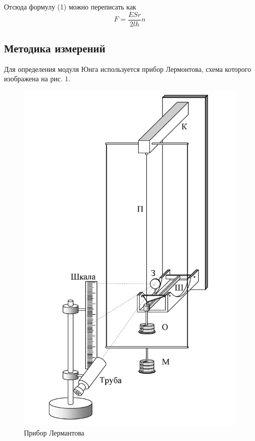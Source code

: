 \documentclass[12pt]{article}
\begin{document}
    Отсюда формулу (1) можно переписать как
    \begin{equation}
        F = \frac{ESr}{2lh}n
    \end{equation}

    \subsection{Методика измерений}
    \par Для определения модуля Юнга используется прибор Лермонтова,
    схема которого изображена на рис. 1. 

    \begin{figure}[H]
        \centering
        \includegraphics[scale = 0.3]{pictures/lermantov.png}
        \caption{Прибор Лермантова}
    \end{figure}
\end{document}
